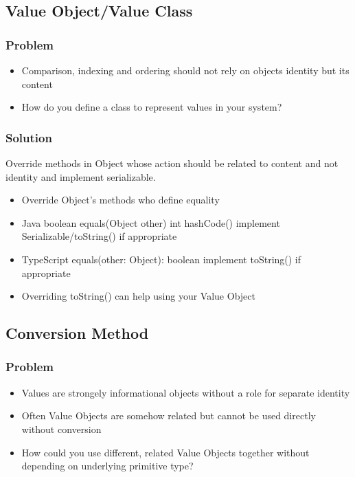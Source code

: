 \subsection{Value Object/Value Class}
\subsubsection{Problem}
\begin{itemize}[topsep=0pt]
    \itemsep -0.4em
    \item Comparison, indexing and ordering should not rely on objects identity but its content
    \item How do you define a class to represent values in your system?
\end{itemize}
\subsubsection{Solution}
Override methods in Object whose action should be related to content and not identity and implement serializable.
\begin{itemize}[topsep=0pt]
    \itemsep -0.4em
    \item Override Object's methods who define equality
    \item Java
        \SubItem boolean equals(Object other)
        \SubItem int hashCode()
        \SubItem implement Serializable/toString() if appropriate
    \item TypeScript
        \SubItem equals(other: Object): boolean
        \SubItem implement toString() if appropriate
    \item Overriding toString() can help using your Value Object
\end{itemize}

\subsection{Conversion Method}
\subsubsection{Problem}
\begin{itemize}[topsep=0pt]
    \itemsep -0.4em
    \item Values are strongely informational objects without a role for separate identity
    \item Often Value Objects are somehow related but cannot be used directly without conversion
    \item How could you use different, related Value Objects together without depending on underlying primitive type?
\end{itemize}

